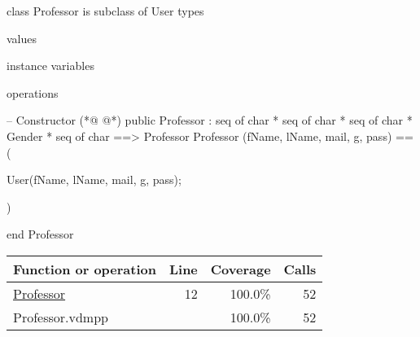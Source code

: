 \begin{vdmpp}[breaklines=true]
class Professor is subclass of User
types

values

instance variables
 

operations

 -- Constructor
(*@
\label{Professor:12}
@*)
 public Professor : seq of char * seq of char * seq of char * Gender * seq of char ==> Professor
 Professor (fName, lName, mail, g, pass) == (
 
  User(fName, lName, mail, g, pass);
 
 )
  
   
 
end Professor
\end{vdmpp}
\bigskip
\begin{longtable}{|l|r|r|r|}
\hline
Function or operation & Line & Coverage & Calls \\
\hline
\hline
\hyperref[Professor:12]{Professor} & 12&100.0\% & 52 \\
\hline
\hline
Professor.vdmpp & & 100.0\% & 52 \\
\hline
\end{longtable}

